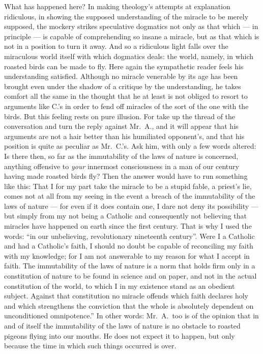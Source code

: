 \documentclass[12pt,a4paper]{book}
\newcommand{\opage}[1]{\marginnote{\footnotesize\textit{[#1]}}}
\begin{document}
What has happened here? In making theology's attempts at explanation
ridiculous, in showing the supposed understanding of the miracle to be merely
supposed,
\opage{19}the mockery strikes speculative dogmatics not only as that which ---
in principle --- is capable of comprehending so insane a miracle, but as that
which is not in a position to turn it away. And so a ridiculous light falls
over the miraculous world itself with which dogmatics deals: the world, namely,
in which roasted birds can be made to fly. Here again the sympathetic reader
feels his understanding satisfied. Although no miracle venerable by its age has
been brought even under the shadow of a critique by the understanding, he takes
comfort all the same in the thought that he at least is not obliged to resort
to arguments like C.'s in order to fend off miracles of the sort of the one
with the birds. But this feeling rests on pure illusion. For take up the thread
of the conversation and turn the reply against Mr.\ A., and it will appear that
his arguments are not a hair better than his humiliated opponent's, and that
his position is quite as peculiar as Mr.\ C.'s. Ask him, with only a few words
altered: Is there then, so far as the immutability of the laws of nature is
concerned, anything offensive to \emph{your} innermost consciousness in a man
of our century having made roasted birds fly? Then the answer would have to run
something like this: That I for my part take the miracle to be a stupid fable,
a priest's lie, comes not at all from my seeing in the event a breach of the
immutability of the laws of nature --- for even if it does contain one, I dare
not
\opage{20}deny its possibility --- but simply from my not being a Catholic and
consequently not believing that miracles have happened on earth since the first
century. That is why I used the words: ``in our unbelieving, revolutionary
nineteenth century''. Were I a Catholic and had a Catholic's faith, I should no
doubt be capable of reconciling my faith with my knowledge; for I am not
answerable to my reason for what I accept in faith. The immutability of the
laws of nature is a norm that holds firm only in a constitution of nature to be
found in science and on paper, and not in the actual constitution of the world,
to which I in my existence stand as an obedient subject. Against that
constitution no miracle offends which faith declares holy and which strengthens
the conviction that the whole is absolutely dependent on unconditioned
omnipotence.'' In other words: Mr.\ A.\ too is of the opinion that in and of
itself the immutability of the laws of nature is no obstacle to roasted pigeons
flying into our mouths. He does not expect it to happen, but only because the
time in which such things occurred is over.
\end{document}
